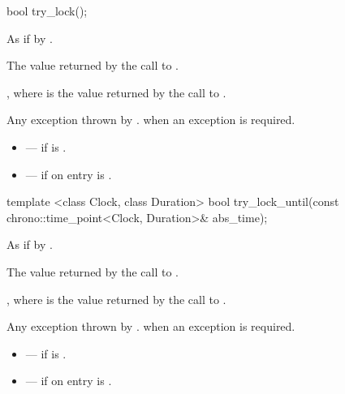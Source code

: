 %
\begin{itemdecl}
bool try_lock();
\end{itemdecl}

\begin{itemdescr}
\pnum
\effects As if by .

\pnum
\returns The value returned by the call to .

\pnum
\postconditions {}, where  is the value returned by
the call to .

\pnum
\throws Any exception thrown by .
 when an exception is required.

\pnum
\errors
\begin{itemize}
\item {} --- if  is .
\item {} --- if on entry  is
.
\end{itemize}
\end{itemdescr}

%
\begin{itemdecl}
template <class Clock, class Duration>
  bool
  try_lock_until(const chrono::time_point<Clock, Duration>& abs_time);
\end{itemdecl}

\begin{itemdescr}
\pnum
\effects As if by .

\pnum
\returns The value returned by the call to
.

\pnum
\postconditions {}, where  is the value returned by
the call to .

\pnum
\throws Any exception thrown by .
 when an exception is required.

\pnum
\errors
\begin{itemize}
\item {} --- if  is .
\item {} --- if on entry  is
.
\end{itemize}
\end{itemdescr}

